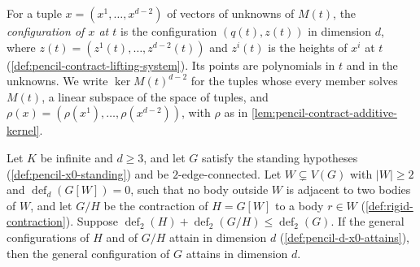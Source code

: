 For a tuple $x = (x^1, \dots, x^{d-2})$ of vectors of unknowns of
$M(t)$, the \emph{configuration of $x$ at $t$} is the configuration
$(q(t), z(t))$ in dimension $d$, where
$z(t) = (z^1(t), \dots, z^{d-2}(t))$ and $z^i(t)$ is the heights of $x^i$
at $t$ (\cref{def:pencil-contract-lifting-system}). Its points are
polynomials in $t$ and in the unknowns. We write $\ker M(t)^{d-2}$ for the
tuples whose every member solves $M(t)$, a linear subspace of the space
of tuples, and $\rho(x) = (\rho(x^1), \dots, \rho(x^{d-2}))$, with $\rho$
as in \cref{lem:pencil-contract-additive-kernel}.

\begin{theorem}
  \label{thm:pencil-d-contract-additive}
  \leanok
  Let $K$ be infinite and $d \ge 3$, and let $G$ satisfy the standing
  hypotheses (\cref{def:pencil-x0-standing}) and be $2$-edge-connected.
  Let $W \subsetneq V(G)$ with $|W| \ge 2$ and
  $\operatorname{def}_d(G[W]) = 0$, such that no body outside $W$ is
  adjacent to two bodies of $W$, and let $G/H$ be the contraction of
  $H = G[W]$ to a body $r \in W$ (\cref{def:rigid-contraction}). Suppose
  $\operatorname{def}_2(H) + \operatorname{def}_2(G/H) \le
  \operatorname{def}_2(G)$. If the general configurations of $H$ and of
  $G/H$ attain in dimension $d$ (\cref{def:pencil-d-x0-attains}), then
  the general configuration of $G$ attains in dimension $d$.
\end{theorem}
